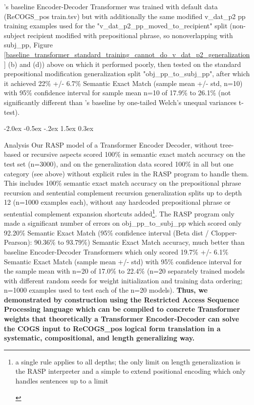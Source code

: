 \documentclass[11pt]{article}
\makeatletter
\renewcommand\section{\@startsection{section}{1}{\z@}%
                                  {-2.0ex \@plus -0.5ex \@minus -.2ex}%
                                  {1.5ex \@plus 0.3ex}%
                                  {\large\bfseries\raggedright}}
\makeatother
\begin{document}
\citep{Wu2023}'s baseline Encoder-Decoder Transformer was trained with default data (ReCOGS\_pos train.tsv) but with additionally the same modified v\_dat\_p2 pp training examples used for the "v\_dat\_p2\_pp\_moved\_to\_recipient" split (non-subject recipient modified with prepositional phrase, so nonoverlapping with subj\_pp, Figure \ref{baseline_transformer_standard_training_cannot_do_v_dat_p2_generalization} (b) and (d)) above on which it performed poorly, then tested on the standard prepositional modification generalization split "obj\_pp\_to\_subj\_pp", after which it achieved 22\% +/- 6.7\% Semantic Exact Match (sample mean +/- std, n=10) with 95\% confidence interval for sample mean n=10 of 17.9\% to 26.1\% (not significantly different than \citep{Wu2023}'s baseline by one-tailed Welch's unequal variances t-test). 

\section{Analysis} 
Our RASP model of a Transformer Encoder Decoder, without tree-based or recursive aspects scored 100\% in semantic exact match accuracy on the \citep{Wu2023} test set (n=3000), and on the generalization data scored 100\% in all but one category (see above) without explicit rules in the RASP program to handle them. This includes 100\% semantic exact match accuracy on the prepositional phrase recursion and sentential complement recursion generalization splits up to depth 12 (n=1000 examples each), without any hardcoded prepositional phrase or sentential complement expansion shortcuts added\footnote{\begin{footnotesize}a single rule applies to all depths; the only limit on length generalization is the RASP interpreter and a simple to extend positional encoding which only handles sentences up to a limit
\end{footnotesize}}. The RASP program only made a significant number of errors on obj\_pp\_to\_subj\_pp which scored only 92.20\% Semantic Exact Match (95\% confidence interval (Beta dist / Clopper-Pearson): 90.36\% to 93.79\%) Semantic Exact Match accuracy, much better than \citep{Wu2023} baseline Encoder-Decoder Transformers which only scored 19.7\% +/- 6.1\% Semantic Exact Match (sample mean +/- std) with 95\% confidence interval for the sample mean with n=20 of 17.0\% to 22.4\% (n=20 separately trained models with different random seeds for weight initialization and training data ordering; n=1000 examples used to test each of the n=20 models). \textbf{Thus, we demonstrated by construction using the Restricted Access Sequence Processing language which can be compiled to concrete Transformer weights that theoretically a Transformer Encoder-Decoder can solve the COGS input to ReCOGS\_pos logical form translation in a systematic, compositional, and length generalizing way.}
\end{document}
